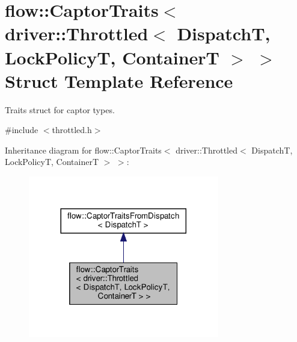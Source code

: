 \hypertarget{structflow_1_1_captor_traits_3_01driver_1_1_throttled_3_01_dispatch_t_00_01_lock_policy_t_00_01_container_t_01_4_01_4}{}\section{flow\+:\+:Captor\+Traits$<$ driver\+:\+:Throttled$<$ DispatchT, Lock\+PolicyT, ContainerT $>$ $>$ Struct Template Reference}
\label{structflow_1_1_captor_traits_3_01driver_1_1_throttled_3_01_dispatch_t_00_01_lock_policy_t_00_01_container_t_01_4_01_4}


Traits struct for captor types.  




{\ttfamily \#include $<$throttled.\+h$>$}



Inheritance diagram for flow\+:\+:Captor\+Traits$<$ driver\+:\+:Throttled$<$ DispatchT, Lock\+PolicyT, ContainerT $>$ $>$\+:\nopagebreak
\begin{figure}[H]
\begin{center}
\leavevmode
\includegraphics[width=236pt]{structflow_1_1_captor_traits_3_01driver_1_1_throttled_3_01_dispatch_t_00_01_lock_policy_t_00_01_0e755db1d06f7e5066d551a93a8a0d39}
\end{center}
\end{figure}


